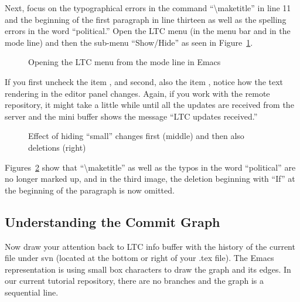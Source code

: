 Next, focus on the typographical errors in the command ``\textbackslash maketitle'' in line 11 and the beginning of the first paragraph in line thirteen as well as the spelling errors in the word ``political.''  Open the LTC menu (in the menu bar and in the mode line) and then the sub-menu ``Show/Hide'' as seen in Figure~\ref{fig:svn-emacs-LTC-menu}.  
\begin{figure}[t]
\centering
{}
\caption{Opening the LTC menu from the mode line in Emacs} \label{fig:svn-emacs-LTC-menu}
\end{figure}
If you first uncheck the item , and second, also the item , notice how the text rendering in the editor panel changes.  Again, if you work with the remote repository, it might take a little while until all the updates are received from the server and the mini buffer shows the message ``LTC updates received.''
\begin{figure}[t]
  \centering
  \hspace{2em}
  \hspace{2em}
\caption[Effect of hiding ``small'' changes and deletions]{Effect of hiding ``small'' changes first (middle) and then also deletions (right)} \label{fig:svn-emacs-filter-small}
\end{figure}
Figures~\ref{fig:svn-emacs-filter-small} show that ``\textbackslash maketitle'' as well as the typos in the word ``political'' are no longer marked up, and in the third image, the deletion beginning with ``If'' at the beginning of the paragraph is now omitted.

\subsection{Understanding the Commit Graph}

Now draw your attention back to LTC info buffer with the history of the current file under svn (located at the bottom or right of your .tex file).  The Emacs representation is using small box characters to draw the graph and its edges.  In our current tutorial repository, there are no branches and the graph is a sequential line.  


